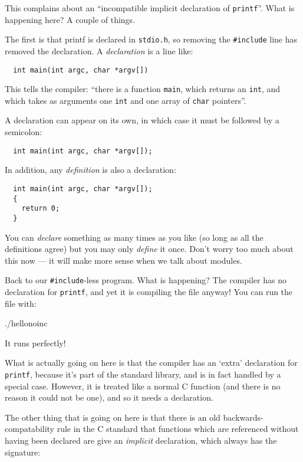 \documentclass[a4paper,10pt]{article}
\newcommand{\kw}[1]{\texttt{#1}}
\newcommand{\filename}[1]{\texttt{#1}}
\begin{document}
\noindent
This complains about an ``incompatible implicit declaration of
\kw{printf}''. What is happening here? A couple of things.

The first is that printf is declared in \filename{stdio.h}, so removing the
\verb!#include! line has removed the declaration. A \emph{declaration}
is a line like:

\begin{lstlisting}
  int main(int argc, char *argv[])
\end{lstlisting}

\noindent
This tells the compiler: ``there is a function \kw{main}, which
returns an \kw{int}, and which takes as arguments one \kw{int} and one
array of \kw{char} pointers''.

A declaration can appear on its own, in which case it must be followed
by a semicolon:

\begin{lstlisting}
  int main(int argc, char *argv[]);
\end{lstlisting}

\noindent
In addition, any \emph{definition} is also a declaration:

\begin{lstlisting}
  int main(int argc, char *argv[]);
  {
    return 0;
  }
\end{lstlisting}

\noindent
You can \emph{declare} something as many times as you like (so long as
all the definitions agree) but you may only \emph{define} it
once. Don't worry too much about this now --- it will make more sense
when we talk about modules.

Back to our \verb|#include|-less program. What is happening? The
compiler has no declaration for \kw{printf}, and yet it is compiling
the file anyway! You can run the file with:

./hellonoinc
\END

\noindent
It runs perfectly!

What is actually going on here is that the compiler has an `extra'
declaration for \kw{printf}, because it's part of the standard
library, and is in fact handled by a special case. However, it is
treated like a normal C function (and there is no reason it could not
be one), and so it needs a declaration.

The other thing that is going on here is that there is an old
backwards-compatability rule in the C standard that functions which
are referenced without having been declared are give an
\emph{implicit} declaration, which always has the signature:
\end{document}
